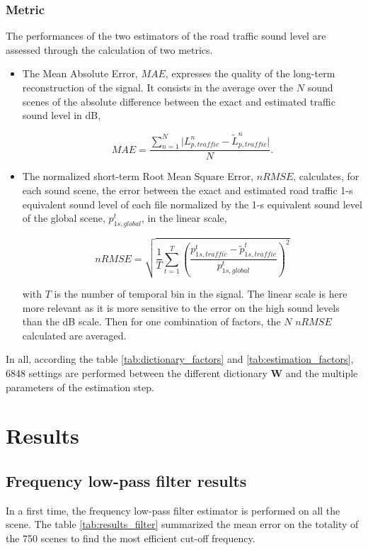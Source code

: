 \documentclass[twocolumn,a4paper,10pt]{article}
\begin{document}
\subsubsection{Metric}
The performances of the two estimators of the road traffic sound level are assessed through the calculation of two metrics. 

\begin{itemize}

\item The Mean Absolute Error, $MAE$, expresses the quality of the long-term reconstruction of the signal. It consists in the average over the $N$ sound scenes of the absolute difference between the exact and estimated traffic sound level in dB, 

\begin{equation}
MAE = \frac{\sum_{n = 1}^N\vert L^n_{p,traffic}-\tilde{L}^n_{p,traffic} \vert}{N}.
\end{equation}

\item The normalized short-term Root Mean Square Error, $nRMSE$, calculates, for each sound scene, the error between the exact and estimated road traffic 1-s equivalent sound level of each file normalized by the 1-s equivalent sound level of the global scene, $p^t_{1s,global}$, in the linear scale, 

\begin{equation}
nRMSE = \sqrt{\frac{1}{T}\sum_{t = 1}^T \left(\frac{p^t_{1s,traffic}-\tilde{p}^t_{1s,traffic}}{p^t_{1s,global}}\right)^2}
\end{equation}

with $T$ is the number of temporal bin in the signal. The linear scale is here more relevant as it is more sensitive to the error on the high sound levels than the dB scale. Then for one combination of factors, the $N$ $nRMSE$ calculated are averaged.\\
\end{itemize}

In all, according the table \ref{tab:dictionary_factors} and \ref{tab:estimation_factors}, 6848 settings are performed between the different dictionary $\mathbf{W}$ and the multiple parameters of the estimation step.

\section{Results}\label{part:results}

\subsection{Frequency low-pass filter results}
In a first time, the frequency low-pass filter estimator is performed on all the scene. The table \ref{tab:results_filter} summarized the mean error on the totality of the 750 scenes to find the most efficient cut-off frequency. \\
\end{document}
